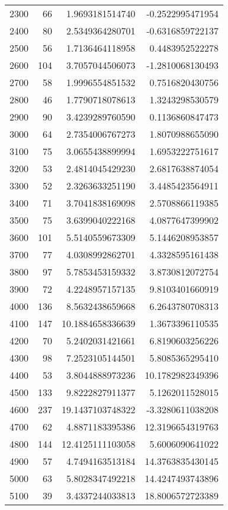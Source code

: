\begin{longtable}{lrrr}
2300 & 66 & 1.9693181514740 & -0.2522995471954 \\
2400 & 80 & 2.5349364280701 & -0.6316859722137 \\
2500 & 56 & 1.7136464118958 & 0.4483952522278 \\
2600 & 104 & 3.7057044506073 & -1.2810068130493 \\
2700 & 58 & 1.9996554851532 & 0.7516820430756 \\
2800 & 46 & 1.7790718078613 & 1.3243298530579 \\
2900 & 90 & 3.4239289760590 & 0.1136860847473 \\
3000 & 64 & 2.7354006767273 & 1.8070988655090 \\
3100 & 75 & 3.0655438899994 & 1.6953222751617 \\
3200 & 53 & 2.4814045429230 & 2.6817638874054 \\
3300 & 52 & 2.3263633251190 & 3.4485423564911 \\
3400 & 71 & 3.7041838169098 & 2.5708866119385 \\
3500 & 75 & 3.6399040222168 & 4.0877647399902 \\
3600 & 101 & 5.5140559673309 & 5.1446208953857 \\
3700 & 77 & 4.0308992862701 & 4.3328595161438 \\
3800 & 97 & 5.7853453159332 & 3.8730812072754 \\
3900 & 72 & 4.2248957157135 & 9.8103401660919 \\
4000 & 136 & 8.5632438659668 & 6.2643780708313 \\
4100 & 147 & 10.1884658336639 & 1.3673396110535 \\
4200 & 70 & 5.2402031421661 & 6.8190603256226 \\
4300 & 98 & 7.2523105144501 & 5.8085365295410 \\
4400 & 53 & 3.8044888973236 & 10.1782982349396 \\
4500 & 133 & 9.8222827911377 & 5.1262011528015 \\
4600 & 237 & 19.1437103748322 & -3.3280611038208 \\
4700 & 62 & 4.8871183395386 & 12.3196654319763 \\
4800 & 144 & 12.4125111103058 & 5.6006090641022 \\
4900 & 57 & 4.7494163513184 & 14.3763835430145 \\
5000 & 63 & 5.8028347492218 & 14.4247493743896 \\
5100 & 39 & 3.4337244033813 & 18.8006572723389 \\
\bottomrule
\end{longtable}
